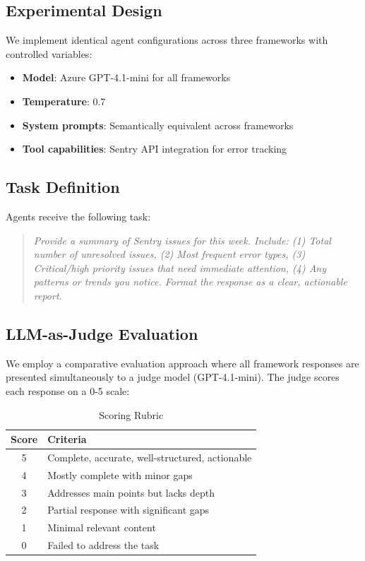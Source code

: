 \documentclass[11pt,a4paper]{article}
\begin{document}
\subsection{Experimental Design}

We implement identical agent configurations across three frameworks with controlled variables:

\begin{itemize}
    \item \textbf{Model}: Azure GPT-4.1-mini for all frameworks
    \item \textbf{Temperature}: 0.7
    \item \textbf{System prompts}: Semantically equivalent across frameworks
    \item \textbf{Tool capabilities}: Sentry API integration for error tracking
\end{itemize}

\subsection{Task Definition}

Agents receive the following task:

\begin{quote}
\textit{Provide a summary of Sentry issues for this week. Include: (1) Total number of unresolved issues, (2) Most frequent error types, (3) Critical/high priority issues that need immediate attention, (4) Any patterns or trends you notice. Format the response as a clear, actionable report.}
\end{quote}

\subsection{LLM-as-Judge Evaluation}

We employ a comparative evaluation approach where all framework responses are presented simultaneously to a judge model (GPT-4.1-mini). The judge scores each response on a 0-5 scale:

\begin{table}[h]
\centering
\caption{Scoring Rubric}
\begin{tabular}{cl}
\toprule
\textbf{Score} & \textbf{Criteria} \\
\midrule
5 & Complete, accurate, well-structured, actionable \\
4 & Mostly complete with minor gaps \\
3 & Addresses main points but lacks depth \\
2 & Partial response with significant gaps \\
1 & Minimal relevant content \\
0 & Failed to address the task \\
\bottomrule
\end{tabular}
\label{tab:rubric}
\end{table}
\end{document}
